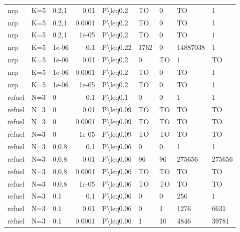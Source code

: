 \begin{longtable}{lllrlllll}
 nrp           & K=5       & 0.2,1 & 0.01   & P\textbackslash{}leq0.2   & TO   & 0    & TO       & 1       \\
 nrp           & K=5       & 0.2,1 & 0.0001 & P\textbackslash{}leq0.2   & TO   & 0    & TO       & 1       \\
 nrp           & K=5       & 0.2,1 & 1e-05  & P\textbackslash{}leq0.2   & TO   & 0    & TO       & 1       \\
 nrp           & K=5       & 1e-06 & 0.1    & P\textbackslash{}leq0.22  & 1762 & 0    & 14887038 & 1       \\
 nrp           & K=5       & 1e-06 & 0.01   & P\textbackslash{}leq0.2   & 0    & TO   & 1        & TO      \\
 nrp           & K=5       & 1e-06 & 0.0001 & P\textbackslash{}leq0.2   & TO   & 0    & TO       & 1       \\
 nrp           & K=5       & 1e-06 & 1e-05  & P\textbackslash{}leq0.2   & TO   & 0    & TO       & 1       \\
 refuel        & N=3       & 0     & 0.1    & P\textbackslash{}leq0.1   & 0    & 0    & 1        & 1       \\
 refuel        & N=3       & 0     & 0.01   & P\textbackslash{}leq0.09  & TO   & TO   & TO       & TO      \\
 refuel        & N=3       & 0     & 0.0001 & P\textbackslash{}leq0.09  & TO   & TO   & TO       & TO      \\
 refuel        & N=3       & 0     & 1e-05  & P\textbackslash{}leq0.09  & TO   & TO   & TO       & TO      \\
 refuel        & N=3       & 0,0.8 & 0.1    & P\textbackslash{}leq0.06  & 0    & 0    & 1        & 1       \\
 refuel        & N=3       & 0,0.8 & 0.01   & P\textbackslash{}leq0.06  & 96   & 96   & 275656   & 275656  \\
 refuel        & N=3       & 0,0.8 & 0.0001 & P\textbackslash{}leq0.06  & TO   & TO   & TO       & TO      \\
 refuel        & N=3       & 0,0.8 & 1e-05  & P\textbackslash{}leq0.06  & TO   & TO   & TO       & TO      \\
 refuel        & N=3       & 0.1   & 0.1    & P\textbackslash{}leq0.06  & 0    & 0    & 256      & 1       \\
 refuel        & N=3       & 0.1   & 0.01   & P\textbackslash{}leq0.06  & 0    & 1    & 1276     & 6631    \\
 refuel        & N=3       & 0.1   & 0.0001 & P\textbackslash{}leq0.06  & 1    & 10   & 4846     & 39781   \\

\end{longtable}

